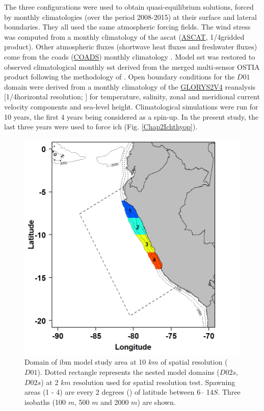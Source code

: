 The three configurations were used to obtain quasi-equilibrium solutions, forced by monthly climatologies (over the period 2008-2015) at their surface and lateral boundaries. They all used the same atmospheric forcing fields. The wind stress was computed from a monthly climatology of the \acrlong{ascat} (\href{https://www.ospo.noaa.gov/Products/atmosphere/ascat/}{ASCAT}, 1/4\textdegree gridded product). Other atmospheric fluxes (shortwave heat fluxes and freshwater fluxes) come from the \acrlong{coads} (\href{https://repository.library.noaa.gov/view/noaa/49337}{COADS}) monthly climatology \citep{DasiYoun1994}. Model \acrfull{sst} was restored to observed climatological monthly \acrshort{sst} derived from the merged multi-sensor OSTIA product \citep{DonlMart2012} following the methodology of \citep{BarnSief1995}. Open boundary conditions for the $D01$ domain were derived from a monthly climatology of the \href{https://www.mercator-ocean.eu/en/ocean-science/glorys/}{GLORYS2V4} reanalysis [1/4\textdegree horizontal resolution; \citep{FerrPare2012}] for temperature, salinity, zonal and meridional current velocity components and sea-level height. Climatological simulations were run for 10 years, the first 4 years being considered as a spin-up. In the present study, the last three years were used to force \gls{ich} (Fig. \ref{Chap2Ichthyop}).\\

\begin{figure}[H]
	\includegraphics[width=1.0\textwidth]{figures/Chap2SpawningZone.png}
	\centering
	\caption{Domain of \acrshort{ibm} model study area at 10 $km$ of spatial resolution ($D01$). Dotted rectangle represents the nested model domains ($D02s$, $D02s$) at 2 $km$ resolution used for spatial resolution test. Spawning areas (1 - 4) are every 2 degrees (\textdegree) of latitude between 6\textdegree – 14\textdegree $S$. Three isobaths (100 $m$, 500 $m$ and 2000 $m$) are shown.}
	\label{Chap2SpawningZone}
\end{figure}

